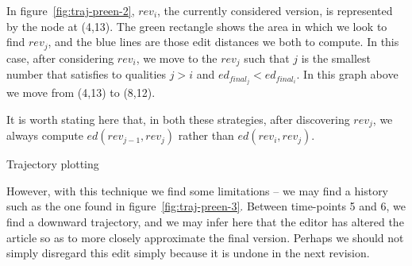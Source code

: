 In figure~\ref{fig:traj-preen-2}, $rev_i$, the currently considered
version, is represented by the node at (4,13). The green rectangle
shows the area in which we look to find $rev_j$, and the blue lines
are those edit distances we both to compute. In this case, after
considering $rev_i$, we move to the $rev_j$ such that $j$ is the
smallest number that satisfies to qualities $j > i$ and $ed_{final_j}
< ed_{final_i}$. In this graph above we move from (4,13) to (8,12).

It is worth stating here that, in both these strategies, after
discovering $rev_j$, we always compute $ed(rev_{j-1}, rev_j)$ rather
than $ed(rev_i,rev_j)$. 

\begin{floatingfigure}[p]{0.4\textwidth}
  \centering
  \pgfplotsset{width=0.4\textwidth}
  \caption{Trajectory plotting}
  \label{fig:traj-preen-3}
\end{floatingfigure}

However, with this technique we find some limitations -- we may find a
history such as the one found in
figure~\ref{fig:traj-preen-3}. Between time-points 5 and 6, we find a
downward trajectory, and we may infer here that the editor has altered
the article so as to more closely approximate the final
version. Perhaps we should not simply disregard this edit simply
because it is undone in the next revision. 

